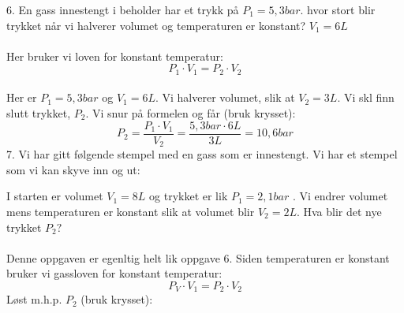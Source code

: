 \documentclass[12pt,a4paper]{article}
\begin{document}
6. En gass innestengt i beholder har et trykk på $P_1=5,3bar$.  hvor stort blir trykket når vi halverer volumet og temperaturen er konstant? $V_1=6L$\\\\
Her bruker vi loven for konstant temperatur:\\
$$P_1\cdot V_1=P_2\cdot V_2$$\\
Her er $P_1=5,3bar$ og $V_1=6L$.  Vi halverer volumet, slik at $V_2=3L$. Vi skl finn slutt trykket, $P_2$.  Vi snur på formelen og får (bruk krysset):\\
$$P_2=\frac{P_1\cdot V_1}{V_2}=\frac{5,3bar\cdot 6L}{3L}=10,6bar$$
7.  Vi har gitt følgende stempel med en gass som er innestengt.  Vi har et stempel som vi kan skyve inn og ut:\vspace{0.5cm}\\
\begin{center}
\end{center}\vspace{1cm}
I starten er volumet $V_1=8L$ og trykket er lik $P_1=2,1bar$ .  Vi endrer volumet mens temperaturen er konstant slik at volumet blir $V_2=2L$.  Hva blir det nye trykket $P_2?$ \\\\
Denne oppgaven er egenltig helt lik oppgave 6. Siden temperaturen er konstant bruker vi gassloven for konstant temperatur:\\
$$P_V\cdot V_1=P_2\cdot V_2$$
Løst m.h.p. $P_2$ (bruk krysset):
\end{document}
